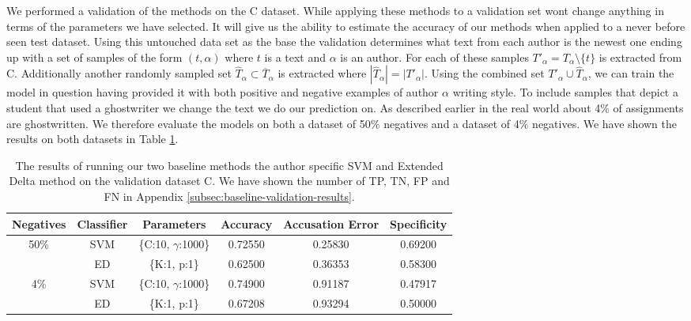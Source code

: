 We performed a validation of the methods on the \gls{C} dataset. While
applying these methods to a validation set wont change anything in terms of
the parameters we have selected. It will give us the ability to estimate the
accuracy of our methods when applied to a never before seen test dataset.
Using this untouched data set as the base the validation determines what text
from each author is the newest one ending up with a set of samples of the
form $(t, \alpha)$ where $t$ is a text and $\alpha$ is an author. For each
of these samples $T'_\alpha = T_\alpha \setminus \{t\}$ is extracted from
\gls{C}. Additionally another randomly sampled set $\hat{T}_\alpha \subset
\overline{T}_\alpha$ is extracted where $|\hat{T}_\alpha| = |T'_\alpha|$. Using
the combined set $T'_\alpha \cup \hat{T}_\alpha$, we can train the model in
question having provided it with both positive and negative examples of author
$\alpha$ writing style. To include samples that depict a student that used a
ghostwriter we change the text we do our prediction on. As described earlier in
the real world about 4\% of assignments are ghostwritten. We therefore evaluate
the models on both a dataset of 50\% negatives and a dataset of 4\% negatives.
We have shown the results on both datasets in Table \ref{tab:baseline-val-res}.

\begin{table}[h]
    \begin{adjustbox}{center}
    \begin{tabular}{|c|c|c||c|c|c|}
        \hline
        \textbf{Negatives} & \textbf{Classifier} & \textbf{Parameters} &
        \textbf{Accuracy} & \textbf{Accusation Error} & \textbf{Specificity} \\ \hline

        50\% & SVM & \{C:10, $\gamma$:1000\} & 0.72550 & 0.25830 & 0.69200 \\ \cline{2-6}

        & ED & \{K:1, p:1\} & 0.62500 & 0.36353 & 0.58300 \\ \hline

        4\%  & SVM & \{C:10, $\gamma$:1000\} & 0.74900 & 0.91187 & 0.47917 \\ \cline{2-6}

        & ED & \{K:1, p:1\} & 0.67208 & 0.93294 & 0.50000 \\ \hline
    \end{tabular}
    \end{adjustbox}
    \caption{The results of running our two baseline methods the author specific
        \gls{SVM} and Extended Delta method on the validation dataset \gls{C}.
        We have shown the number of \gls{TP}, \gls{TN}, \gls{FP} and \gls{FN} in
        Appendix \ref{subsec:baseline-validation-results}.}
    \label{tab:baseline-val-res}
\end{table}

